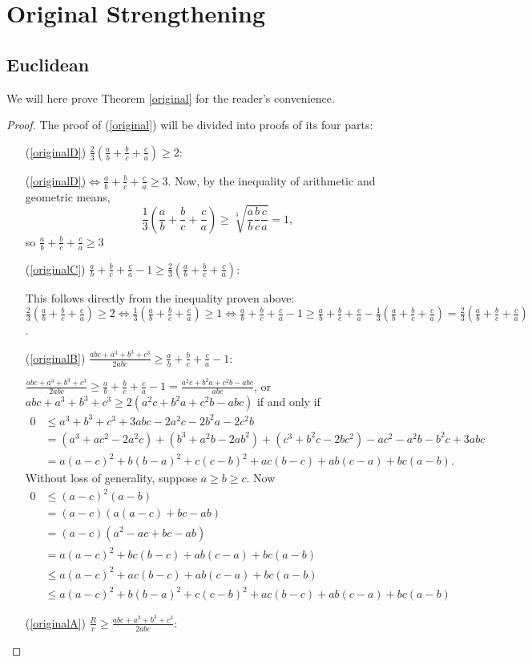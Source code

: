 \documentclass[12pt,notitlepage]{amsart}%
\newcommand{\fracsum}{\frac{a}{b}+\frac{b}{c}+\frac{c}{a}}
\begin{document}
\section{Original Strengthening}

\subsection{Euclidean}

We will here prove Theorem \ref{original} for the reader's convenience.
\begin{proof}
The proof of (\ref{original}) will be divided into proofs of its four parts:
\begin{itemize}
\item[(\ref{originalD})] $\frac{2}{3}(\fracsum)\geq2$:

		(\ref{originalD})$\iff\fracsum\geq3$. Now, by the inequality of arithmetic and geometric means, 
        \[\frac{1}{3}\left( \fracsum\right) \geq\sqrt[3]{\frac{a}{b}\frac{b}{c}\frac{c}{a}}=1,\]
        so 
        $\fracsum\geq3$

\item[(\ref{originalC})] $\fracsum-1\geq\frac{2}{3}(\fracsum)$:

    	This follows directly from the inequality proven above: 
        $\frac{2}{3}(\fracsum)\geq2\iff\frac{1}{3}(\fracsum)\geq1\iff\fracsum-1\geq\fracsum-\frac{1}{3}(\fracsum)=\frac{2}{3}(\fracsum)$.
\item[(\ref{originalB})] $\frac{abc+a^3+b^3+c^3}{2abc}\geq\fracsum-1$:

		$\frac{abc+a^3+b^3+c^3}{2abc}\geq\fracsum-1=\frac{a^2c+b^2a+c^2b-abc}{abc}$, or  $abc+a^3+b^3+c^3\geq 2(a^2c+b^2a+c^2b-abc)$ if and only if
        \begin{align*}
        0&\leq a^3+b^3+c^3+3abc-2a^2c-2b^2a-2c^2b\\
        &=(a^3+ac^2-2a^2c)+(b^3+a^2b-2ab^2)+(c^3+b^2c-2bc^2)-ac^2-a^2b-b^2c+3abc\\ 
        &=a(a-c)^2+b(b-a)^2+c(c-b)^2+ac(b-c)+ab(c-a)+bc(a-b).  
        \end{align*}
        Without loss of generality, suppose $a\geq b\geq c$. Now
		\begin{align*}
  		0&\leq (a-c)^2(a-b)\\
        &=(a-c)(a(a-c)+bc-ab)\\
        &=(a-c)(a^2-ac+bc-ab)\\
        &=a(a-c)^2+bc(b-c)+ab(c-a)+bc(a-b)\\
        &\leq a(a-c)^2+ac(b-c)+ab(c-a)+bc(a-b)\\
        &\leq a(a-c)^2+b(b-a)^2+c(c-b)^2+ac(b-c)+ab(c-a)+bc(a-b)
        \end{align*}
\item[(\ref{originalA})] $\frac{R}{r}\geq\frac{abc+a^3+b^3+c^3}{2abc}$:
       

\end{itemize}
\end{proof}
\end{document}
